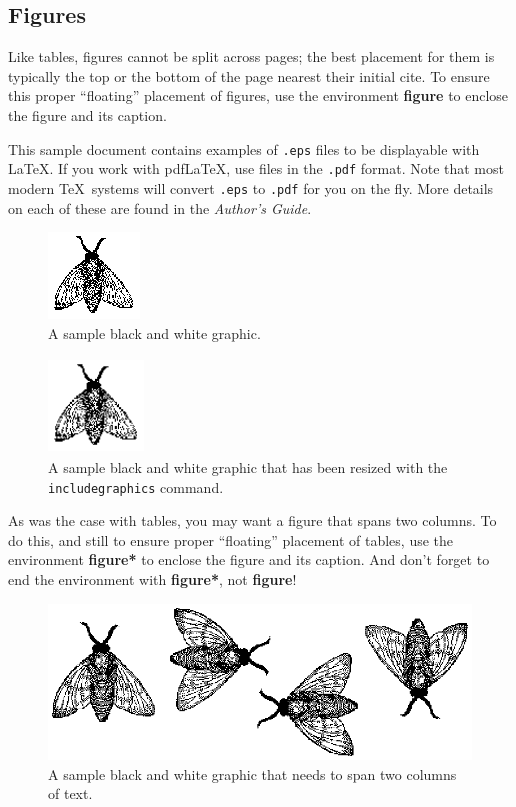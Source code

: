 \subsection{Figures}

Like tables, figures cannot be split across pages; the best placement
for them is typically the top or the bottom of the page nearest their
initial cite.  To ensure this proper ``floating'' placement of
figures, use the environment \textbf{figure} to enclose the figure and
its caption.

This sample document contains examples of \texttt{.eps} files to be
displayable with \LaTeX.  If you work with pdf\LaTeX, use files in the
\texttt{.pdf} format.  Note that most modern \TeX\ systems will convert
\texttt{.eps} to \texttt{.pdf} for you on the fly.  More details on
each of these are found in the \textit{Author's Guide}.

\begin{figure}
\includegraphics{fly}
\caption{A sample black and white graphic.}
\end{figure}

\begin{figure}
\includegraphics[height=1in, width=1in]{fly}
\caption{A sample black and white graphic
that has been resized with the \texttt{includegraphics} command.}
\end{figure}


As was the case with tables, you may want a figure that spans two
columns.  To do this, and still to ensure proper ``floating''
placement of tables, use the environment \textbf{figure*} to enclose
the figure and its caption.  And don't forget to end the environment
with \textbf{figure*}, not \textbf{figure}!

\begin{figure}
\includegraphics{flies}
\caption{A sample black and white graphic
that needs to span two columns of text.}
\end{figure}


